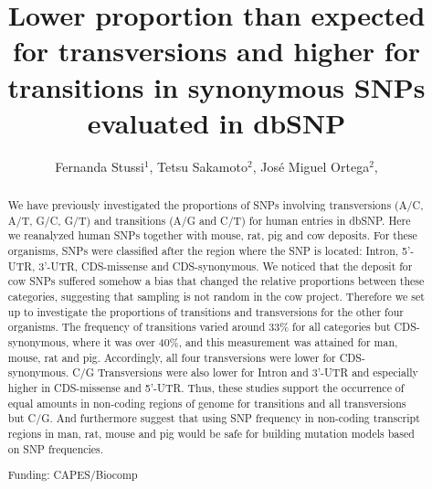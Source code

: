 \documentclass[twoside]{article}
\title{\vspace{-15mm}\fontsize{24pt}{10pt}\selectfont\textbf{ Lower proportion than expected for transversions and higher for transitions in synonymous SNPs evaluated in dbSNP }} %
\author{ Fernanda Stussi$^{1}$, Tetsu Sakamoto$^{2}$, José Miguel Ortega$^{2}$, }
\affil{ 1 UFMG

2 Universidade Federal de Minas Gerais, Laboratório de Biodados

 }
\date{}
\begin{document}
  
  
  \maketitle %
  
  
  \thispagestyle{fancy} %
  
  
  \begin{abstract}
  We have previously investigated the proportions of SNPs involving transversions (A/C, A/T, G/C, G/T) and transitions (A/G and C/T) for human entries in dbSNP. Here we reanalyzed human SNPs together with mouse, rat, pig and cow deposits. For these organisms, SNPs were classified after the region where the SNP is located: Intron, 5’-UTR, 3’-UTR, CDS-missense and CDS-synonymous. We noticed that the deposit for cow SNPs suffered somehow a bias that changed the relative proportions between these categories, suggesting that sampling is not random in the cow project. Therefore we set up to investigate the proportions of transitions and transversions for the other four organisms. The frequency of transitions varied around 33\% for all categories but CDS-synonymous, where it was over 40\%, and this measurement was attained for man, mouse, rat and pig. Accordingly, all four transversions were lower for CDS-synonymous. C/G Transversions were also lower for Intron and 3’-UTR and especially higher in CDS-missense and 5’-UTR. Thus, these studies support the occurrence of equal amounts in non-coding regions of genome for transitions and all transversions but C/G. And furthermore suggest that using SNP frequency in non-coding transcript regions in man, rat, mouse and pig would be safe for building mutation models based on SNP frequencies.
  
  Funding: CAPES/Biocomp \\ 
  \end{abstract}
  
\end{document}
